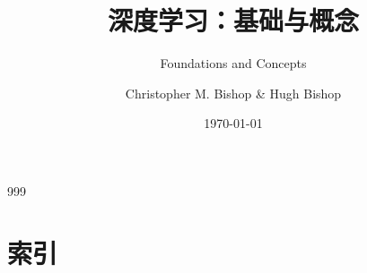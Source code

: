 \documentclass[lang=cn,newtx,10pt,scheme=Chinese,citestyle=authoryear,bibstyle=authoryear]{../../Template/elegantbook}
\title{深度学习：基础与概念}
\subtitle{Foundations and Concepts}
\author{Christopher M. Bishop \& Hugh Bishop}
\institute{邹欣\quad 阮思捷\quad 刘志毅\quad 王树良\quad 译}
\date{\today}
\begin{document}

\maketitle

\frontmatter

\tableofcontents%

\mainmatter%

























\appendix







\renewcommand{\bibname}{参考资料}
\clearpage
\begingroup
\small
\begin{thebibliography}{999}


\end{thebibliography}
\endgroup


\chapter*{索引}
\begingroup
\small




\endgroup
\end{document}
